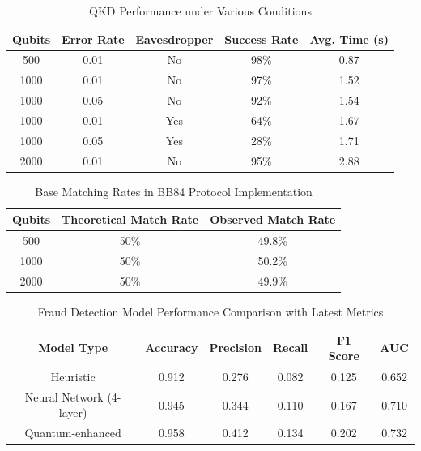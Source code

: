 \begin{table}[!htb]
\centering
\small
\begin{tabular}{|c|c|c|c|c|}
\hline
\textbf{Qubits} & \textbf{Error Rate} & \textbf{Eavesdropper} & \textbf{Success Rate} & \textbf{Avg. Time (s)} \\
\hline
500 & 0.01 & No & 98\% & 0.87 \\
\hline
1000 & 0.01 & No & 97\% & 1.52 \\
\hline
1000 & 0.05 & No & 92\% & 1.54 \\
\hline
1000 & 0.01 & Yes & 64\% & 1.67 \\
\hline
1000 & 0.05 & Yes & 28\% & 1.71 \\
\hline
2000 & 0.01 & No & 95\% & 2.88 \\
\hline
\end{tabular}
\caption{QKD Performance under Various Conditions}
\label{tab:qkd_performance}
\end{table}

\begin{table}[!htb]
\centering
\begin{tabular}{|c|c|c|}
\hline
\textbf{Qubits} & \textbf{Theoretical Match Rate} & \textbf{Observed Match Rate} \\
\hline
500 & 50\% & 49.8\% \\
\hline
1000 & 50\% & 50.2\% \\
\hline
2000 & 50\% & 49.9\% \\
\hline
\end{tabular}
\caption{Base Matching Rates in BB84 Protocol Implementation}
\label{tab:base_matching}
\end{table}

\begin{table}[!htb]
\centering
\small
\begin{tabular}{|c|c|c|c|c|c|}
\hline
\cellcolor{lightblue!30}\textbf{Model Type} & \cellcolor{lightblue!30}\textbf{Accuracy} & \cellcolor{lightblue!30}\textbf{Precision} & \cellcolor{lightblue!30}\textbf{Recall} & \cellcolor{lightblue!30}\textbf{F1 Score} & \cellcolor{lightblue!30}\textbf{AUC} \\
\hline
Heuristic & 0.912 & 0.276 & 0.082 & 0.125 & 0.652 \\
\hline
Neural Network (4-layer) & 0.945 & 0.344 & 0.110 & 0.167 & 0.710 \\
\hline
Quantum-enhanced & 0.958 & 0.412 & 0.134 & 0.202 & 0.732 \\
\hline
\end{tabular}
\caption{Fraud Detection Model Performance Comparison with Latest Metrics}
\label{tab:fraud_performance_latest}
\end{table}

